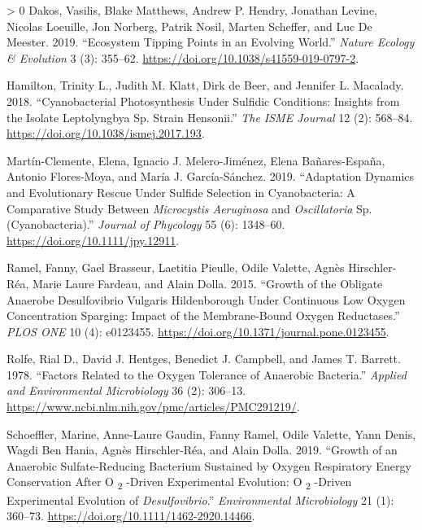 \documentclass{article}
\newlength{\cslhangindent}
\newenvironment{CSLReferences}[3] %
 {%
  \setlength{\parindent}{0pt}
  \ifodd #1 \everypar{\setlength{\hangindent}{\cslhangindent}}\ignorespaces\fi
  \ifnum #2 > 0
  \setlength{\parskip}{#2\baselineskip}
  \fi
 }%
 {}
\begin{document}
\hypertarget{refs}{}
\begin{CSLReferences}{1}{0}
\leavevmode\hypertarget{ref-dakos2019}{}%
Dakos, Vasilis, Blake Matthews, Andrew P. Hendry, Jonathan Levine,
Nicolas Loeuille, Jon Norberg, Patrik Nosil, Marten Scheffer, and Luc De
Meester. 2019. {``Ecosystem Tipping Points in an Evolving World.''}
\emph{Nature Ecology \& Evolution} 3 (3): 355--62.
\url{https://doi.org/10.1038/s41559-019-0797-2}.

\leavevmode\hypertarget{ref-hamilton2018}{}%
Hamilton, Trinity L., Judith M. Klatt, Dirk de Beer, and Jennifer L.
Macalady. 2018. {``Cyanobacterial Photosynthesis Under Sulfidic
Conditions: Insights from the Isolate Leptolyngbya Sp. Strain
Hensonii.''} \emph{The ISME Journal} 12 (2): 568--84.
\url{https://doi.org/10.1038/ismej.2017.193}.

\leavevmode\hypertarget{ref-martuxednclemente2019}{}%
Martín-Clemente, Elena, Ignacio J. Melero-Jiménez, Elena Bañares-España,
Antonio Flores-Moya, and María J. García-Sánchez. 2019. {``Adaptation
Dynamics and Evolutionary Rescue Under Sulfide Selection in
Cyanobacteria: A Comparative Study Between {\emph{Microcystis
Aeruginosa}} and {\emph{Oscillatoria}} Sp. (Cyanobacteria).''}
\emph{Journal of Phycology} 55 (6): 1348--60.
\url{https://doi.org/10.1111/jpy.12911}.

\leavevmode\hypertarget{ref-ramel2015}{}%
Ramel, Fanny, Gael Brasseur, Laetitia Pieulle, Odile Valette, Agnès
Hirschler-Réa, Marie Laure Fardeau, and Alain Dolla. 2015. {``Growth of
the Obligate Anaerobe Desulfovibrio Vulgaris Hildenborough Under
Continuous Low Oxygen Concentration Sparging: Impact of the
Membrane-Bound Oxygen Reductases.''} \emph{PLOS ONE} 10 (4): e0123455.
\url{https://doi.org/10.1371/journal.pone.0123455}.

\leavevmode\hypertarget{ref-rolfe1978}{}%
Rolfe, Rial D., David J. Hentges, Benedict J. Campbell, and James T.
Barrett. 1978. {``Factors Related to the Oxygen Tolerance of Anaerobic
Bacteria.''} \emph{Applied and Environmental Microbiology} 36 (2):
306--13. \url{https://www.ncbi.nlm.nih.gov/pmc/articles/PMC291219/}.

\leavevmode\hypertarget{ref-schoeffler2019}{}%
Schoeffler, Marine, Anne-Laure Gaudin, Fanny Ramel, Odile Valette, Yann
Denis, Wagdi Ben Hania, Agnès Hirschler-Réa, and Alain Dolla. 2019.
{``Growth of an Anaerobic Sulfate-Reducing Bacterium Sustained by Oxygen
Respiratory Energy Conservation After O {\textsubscript{2}} -Driven
Experimental Evolution: O {\textsubscript{2}} -Driven Experimental
Evolution of {\emph{Desulfovibrio}}.''} \emph{Environmental
Microbiology} 21 (1): 360--73.
\url{https://doi.org/10.1111/1462-2920.14466}.

\end{CSLReferences}



\end{document}
